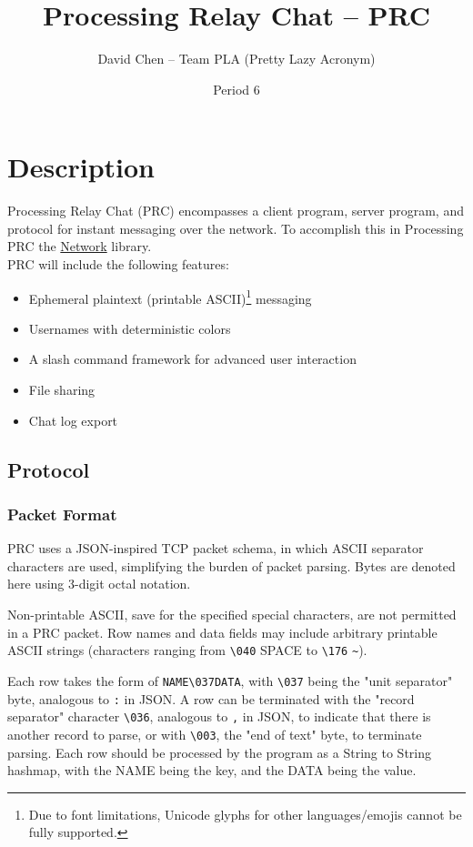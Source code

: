 \documentclass{article}
\title{Processing Relay Chat -- PRC}
\author{David Chen -- Team PLA (Pretty Lazy Acronym)}
\date{Period 6}
\begin{document}
\maketitle

\section{Description}
Processing Relay Chat (PRC) encompasses a client program, server program, and protocol for instant messaging over the network. To accomplish this in Processing PRC the \href{https://processing.org/reference/libraries/net/index.html}{Network} library.\\
PRC will include the following features:
\begin{itemize}
    \item Ephemeral plaintext (printable ASCII)\footnote{Due to font limitations, Unicode glyphs for other languages/emojis cannot be fully supported.} messaging
    \item Usernames with deterministic colors
    \item A slash command framework for advanced user interaction
    \item File sharing
    \item Chat log export
\end{itemize}

\subsection{Protocol}
\subsubsection{Packet Format}
PRC uses a JSON-inspired TCP packet schema, in which ASCII separator characters are used, simplifying the burden of packet parsing. Bytes are denoted here using 3-digit octal notation.

Non-printable ASCII, save for the specified special characters, are not permitted in a PRC packet. Row names and data fields may include arbitrary printable ASCII strings (characters ranging from \verb|\040| SPACE to \verb|\176| \verb|~|).

Each row takes the form of \verb|NAME\037DATA|, with \verb|\037| being the "unit separator" byte, analogous to \verb|:| in JSON.
A row can be terminated with the "record separator" character \verb|\036|, analogous to \verb|,| in JSON, to indicate that there is another record to parse, or with \verb|\003|, the "end of text" byte, to terminate parsing. Each row should be processed by the program as a String to String hashmap, with the NAME being the key, and the DATA being the value.
\end{document}

